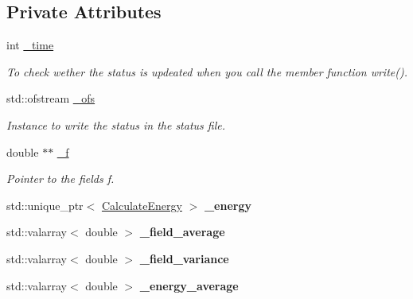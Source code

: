 \subsection*{Private Attributes}
\begin{DoxyCompactItemize}
\item 
\mbox{\label{class_status_a33dc61329a92fd5771e121fe411004ab}} 
int \mbox{\hyperlink{class_status_a33dc61329a92fd5771e121fe411004ab}{\+\_\+time}}
\begin{DoxyCompactList}\small\item\em To check wether the status is updeated when you call the member function \textquotesingle{}write()\textquotesingle{}. \end{DoxyCompactList}\item 
\mbox{\label{class_status_a4f4a73ea4d39218be9357f850d0da0bf}} 
std\+::ofstream \mbox{\hyperlink{class_status_a4f4a73ea4d39218be9357f850d0da0bf}{\+\_\+ofs}}
\begin{DoxyCompactList}\small\item\em Instance to write the status in the status file. \end{DoxyCompactList}\item 
\mbox{\label{class_status_a1c37348ecb8a8c83699b78a801131aac}} 
double $\ast$$\ast$ \mbox{\hyperlink{class_status_a1c37348ecb8a8c83699b78a801131aac}{\+\_\+f}}
\begin{DoxyCompactList}\small\item\em Pointer to the fields f. \end{DoxyCompactList}\item 
\mbox{\label{class_status_af0991d8dd769cea020d29114d4dc493c}} 
std\+::unique\+\_\+ptr$<$ \mbox{\hyperlink{class_calculate_energy}{Calculate\+Energy}} $>$ {\bfseries \+\_\+energy}
\item 
\mbox{\label{class_status_aed39d6b3166423fd6fb034213ae155e1}} 
std\+::valarray$<$ double $>$ {\bfseries \+\_\+field\+\_\+average}
\item 
\mbox{\label{class_status_a872aa7141f3a81006989e0d58a6b0ce4}} 
std\+::valarray$<$ double $>$ {\bfseries \+\_\+field\+\_\+variance}
\item 
\mbox{\label{class_status_a0ba31edaecd8eda04ba8e6dea5126459}} 
std\+::valarray$<$ double $>$ {\bfseries \+\_\+energy\+\_\+average}
\end{DoxyCompactItemize}


